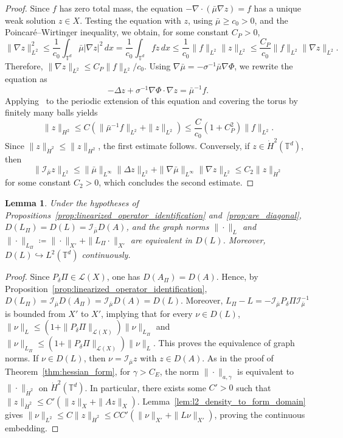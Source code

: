 \documentclass[11pt]{article}
\numberwithin{equation}{section}
\newtheorem{lemma}[theorem]{Lemma}
\theoremstyle{definition}
\newcommand{\T}{\mathbb{T}}
\newcommand{\rieszmap}[1][\mu]{\mathcal{I}_{#1}}
\newcommand{\dotHk}[1][k]{\dot{H}^{#1}}
\begin{document}
\begin{proof} 
    Since $f$ has zero total mass, the equation $-\nabla \cdot (\bar\mu \nabla z) = f$ has a unique weak solution $z \in X$.
    Testing the equation with $z$, using $\bar\mu \ge c_0 > 0$, and the Poincaré--Wirtinger inequality, we obtain, for some constant $C_P > 0$,
    \[
    \|\nabla z\|_{L^2}^2 \le \frac{1}{c_0}\int_{\T^d}\bar\mu|\nabla z|^2\,dx = \frac{1}{c_0}\int_{\T^d} f z \,dx \le \frac{1}{c_0}\|f\|_{L^2}\|z\|_{L^2} \le \frac{C_P}{c_0}\|f\|_{L^2}\|\nabla z\|_{L^2}.
    \]
    Therefore, $\|\nabla z\|_{L^2} \le C_P\|f\|_{L^2}/c_0$.
    Using $\nabla\bar\mu = -\sigma^{-1} \bar\mu \nabla\Phi$, we rewrite the equation as 
    \[ 
    -\Delta z + \sigma^{-1} \nabla\Phi \cdot \nabla z = \bar\mu^{-1}f. 
    \] 
    Applying~\cite[Section~6.3.1, Theorem~1]{evans2022partial} to the periodic extension of this equation and covering the torus by finitely many balls yields 
    \[ 
    \|z\|_{H^2} \le C(\|\bar\mu^{-1}f\|_{L^2} + \|z\|_{L^2}) \le \frac{C}{c_0}(1 + C_P^2)\|f\|_{L^2}.
    \]
    Since $\|z\|_{\dotHk[2]} \le \|z\|_{H^2}$, the first estimate follows. 
    Conversely, if $z \in \dotHk[2](\T^d)$, then
    \[ 
    \|\rieszmap[\bar\mu]z\|_{L^2} \le \|\bar\mu\|_{L^\infty} \|\Delta z\|_{L^2} + \|\nabla\bar\mu\|_{L^\infty}\|\nabla z\|_{L^2} \le C_2\|z\|_{\dotHk[2]}
    \]
    for some constant $C_2 > 0$, which concludes the second estimate.
\end{proof}

\begin{lemma}
\label{lem:closed_loop_domain_equivalence}
    Under the hypotheses of Propositions~\ref{prop:linearized_operator_identification} and~\ref{prop:are_diagonal}, $D(L_{\Pi}) = D(L) = \rieszmap[\bar\mu]D(A)$, and the graph norms $\|\cdot\|_{L}$ and $\|\cdot\|_{L_\Pi} \coloneqq \|\cdot\|_{X'} + \|L_{\Pi}\cdot\|_{X'}$ are equivalent in $D(L)$.
    Moreover, $D(L) \hookrightarrow L^2(\T^d)$ continuously.
\end{lemma}

\begin{proof}
    Since $P_\delta\Pi \in \mathcal{L}(X)$, one has $D(A_\Pi) = D(A)$.
    Hence, by Proposition~\ref{prop:linearized_operator_identification}, $D(L_\Pi) = \rieszmap[\bar\mu]D(A_\Pi) = \rieszmap[\bar\mu]D(A) = D(L)$.
    Moreover, $L_\Pi - L = -\rieszmap[\bar\mu]P_\delta\Pi\rieszmap[\bar\mu]^{-1}$ is bounded from $X'$ to $X'$, implying that for every $\nu \in D(L)$, $\|\nu\|_{L} \le (1 + \|P_\delta \Pi\|_{\mathcal{L}(X)}) \|\nu\|_{L_{\Pi}}$ and $\|\nu\|_{L_{\Pi}} \le (1 + \|P_\delta \Pi\|_{\mathcal{L}(X)}) \|\nu\|_{L}$.
    This proves the equivalence of graph norms.
    If $\nu \in D(L)$, then $\nu = \rieszmap[\bar\mu]z$ with $z \in D(A)$. 
    As in the proof of Theorem~\ref{thm:hessian_form}, for $\gamma > C_E$, the norm $\|\cdot\|_{a,\gamma}$ is equivalent to $\|\cdot\|_{\dotHk[2]}$ on $\dotHk[2](\T^d)$. 
    In particular, there exists some $C' > 0$ such that $\|z\|_{\dotHk[2]} \le C'\left(\|z\|_X + \|Az\|_X\right)$.
    Lemma~\ref{lem:l2_density_to_form_domain} gives $\|\nu\|_{L^2} \le C\|z\|_{\dotHk[2]} \le CC'\left(\|\nu\|_{X'} + \|L\nu\|_{X'}\right)$, proving the continuous embedding.
\end{proof}
\end{document}
